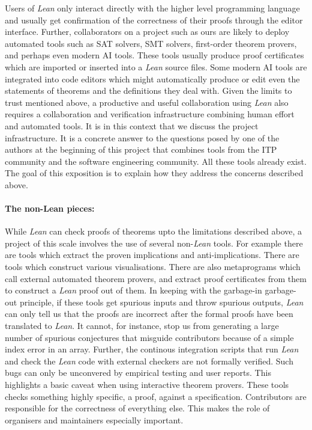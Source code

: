 Users of \emph{Lean} only interact directly with the higher level programming language and usually get confirmation of the correctness of their proofs through the editor interface. Further, collaborators on a project such as ours are likely to deploy automated tools such as SAT solvers, SMT solvers, first-order theorem provers, and perhaps even modern AI tools. These tools usually produce proof certificates which are imported or inserted into a \emph{Lean} source files. Some modern AI tools are integrated into code editors which might automatically produce or edit even the statements of theorems and the definitions they deal with. Given the limits to trust mentioned above, a productive and useful collaboration using \emph{Lean} also requires a collaboration and verification infrastructure combining human effort and automated tools. It is in this context that we discuss the project infrastructure. It is a concrete answer to the questions posed by one of the authors at the beginning of this project \cite{Tao_blog_Sep_2024} that combines tools from the ITP community and the software engineering community. All these tools already exist. The goal of this exposition is to explain how they address the concerns described above.


\paragraph{\textbf{The non-Lean pieces:}} While \emph{Lean} can check proofs of theorems upto the limitations described above, a project of this scale involves the use of several non-\emph{Lean} tools. For example there are tools which extract the proven implications and anti-implications. There are tools which construct various visualisations. There are also metaprograms which call external automated theorem provers, and extract proof certificates from them to construct a \emph{Lean} proof out of them. In keeping with the garbage-in garbage-out principle, if these tools get spurious inputs and throw spurious outputs, \emph{Lean} can only tell us that the proofs are incorrect after the formal proofs have been translated to \emph{Lean}. It cannot, for instance, stop us from generating a large number of spurious conjectures that misguide contributors because of a simple index error in an array. Further, the continous integration scripts that run \emph{Lean} and check the \emph{Lean} code with external checkers are not formally verified. Such bugs can only be unconvered by empirical testing and user reports. This highlights a basic caveat when using interactive theorem provers. These tools checks something highly specific, a proof, against a specification. Contributors are responsible for the correctness of everything else. This makes the role of organisers and maintainers especially important.

